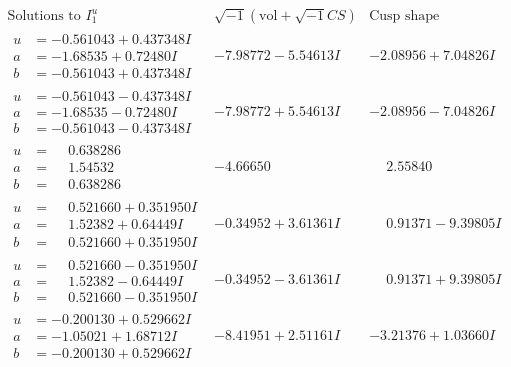 \documentclass[1p]{elsarticle_modified}
\theoremstyle{definition}
\newcommand{\I}{\sqrt{-1}}
\begin{document}
$$\begin{array}{c|c|c}  
\text{Solutions to }I^u_{1}& \I (\text{vol} + \sqrt{-1}CS) & \text{Cusp shape}\\
 \hline 
\begin{aligned}
u &= -0.561043 + 0.437348 I \\
a &= -1.68535 + 0.72480 I \\
b &= -0.561043 + 0.437348 I\end{aligned}
 & -7.98772 - 5.54613 I & -2.08956 + 7.04826 I \\ \hline\begin{aligned}
u &= -0.561043 - 0.437348 I \\
a &= -1.68535 - 0.72480 I \\
b &= -0.561043 - 0.437348 I\end{aligned}
 & -7.98772 + 5.54613 I & -2.08956 - 7.04826 I \\ \hline\begin{aligned}
u &= \phantom{-}0.638286\phantom{ +0.000000I} \\
a &= \phantom{-}1.54532\phantom{ +0.000000I} \\
b &= \phantom{-}0.638286\phantom{ +0.000000I}\end{aligned}
 & -4.66650\phantom{ +0.000000I} & \phantom{-}2.55840\phantom{ +0.000000I} \\ \hline\begin{aligned}
u &= \phantom{-}0.521660 + 0.351950 I \\
a &= \phantom{-}1.52382 + 0.64449 I \\
b &= \phantom{-}0.521660 + 0.351950 I\end{aligned}
 & -0.34952 + 3.61361 I & \phantom{-}0.91371 - 9.39805 I \\ \hline\begin{aligned}
u &= \phantom{-}0.521660 - 0.351950 I \\
a &= \phantom{-}1.52382 - 0.64449 I \\
b &= \phantom{-}0.521660 - 0.351950 I\end{aligned}
 & -0.34952 - 3.61361 I & \phantom{-}0.91371 + 9.39805 I \\ \hline\begin{aligned}
u &= -0.200130 + 0.529662 I \\
a &= -1.05021 + 1.68712 I \\
b &= -0.200130 + 0.529662 I\end{aligned}
 & -8.41951 + 2.51161 I & -3.21376 + 1.03660 I \\ \hline\begin{aligned}

\end{aligned}
\end{array}$$
\end{document}
